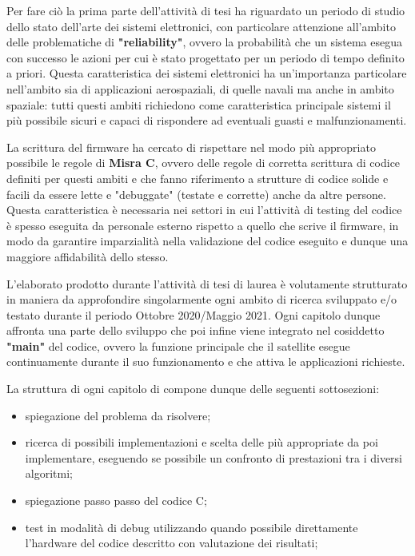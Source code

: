 \documentclass[LaM,binding=0.6cm]{../sapthesis}
\begin{document}
Per fare ciò la prima parte dell'attività di tesi ha riguardato un periodo di studio dello stato dell'arte dei sistemi elettronici, con particolare attenzione all'ambito delle problematiche di \textbf{"reliability"}, ovvero la probabilità che un sistema esegua con successo le azioni per cui è stato progettato per un periodo di tempo definito a priori. Questa caratteristica dei sistemi elettronici ha un'importanza particolare nell'ambito sia di applicazioni aerospaziali, di quelle navali ma anche in ambito spaziale: tutti questi ambiti richiedono come caratteristica principale sistemi il più possibile sicuri e capaci di rispondere ad eventuali guasti e malfunzionamenti.

La scrittura del firmware ha cercato di rispettare nel modo più appropriato possibile le regole di \textbf{Misra C}, ovvero delle regole di corretta scrittura di codice definiti per questi ambiti e che fanno riferimento a strutture di codice solide e facili da essere lette e "debuggate" (testate e corrette) anche da altre persone. Questa caratteristica è necessaria nei settori in cui l'attività di testing del codice è spesso eseguita da personale esterno rispetto a quello che scrive il firmware, in modo da garantire imparzialità nella validazione del codice eseguito e dunque una maggiore affidabilità dello stesso.
    
L'elaborato prodotto durante l'attività di tesi di laurea è volutamente strutturato in maniera da approfondire singolarmente ogni ambito di ricerca sviluppato e/o testato durante il periodo Ottobre 2020/Maggio 2021.
Ogni capitolo dunque affronta una parte dello sviluppo che poi infine viene integrato nel cosiddetto \textbf{"main"} del codice, ovvero la funzione principale che il satellite esegue continuamente durante il suo funzionamento e che attiva le applicazioni richieste.
    
La struttura di ogni capitolo di compone dunque delle seguenti sottosezioni:
\begin{itemize}
    \item spiegazione del problema da risolvere;
    \item ricerca di possibili implementazioni e scelta delle più appropriate da poi implementare, eseguendo se possibile un confronto di prestazioni tra i diversi algoritmi;
    \item spiegazione passo passo del codice C;
    \item test in modalità di debug utilizzando quando possibile direttamente l'hardware del codice descritto con valutazione dei risultati;
    \end{itemize}
    
\end{document}
